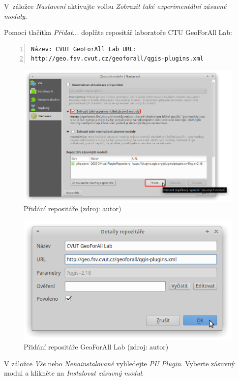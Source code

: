 V~záložce \textit{Nastavení} aktivujte volbu \textit{Zobrazit také
experimentální zásuvné moduly}.

Pomocí tlačítka \textit{Přidat...} doplňte repositář laboratoře
CTU GeoForAll Lab:

\begin{lstlisting}[basicstyle=\footnotesize\ttfamily, backgroundcolor
= \color{light-gray}, numbers=left, columns=fullflexible,
keepspaces=true] Název: CVUT GeoForAll Lab URL:
http://geo.fsv.cvut.cz/geoforall/qgis-plugins.xml
\end{lstlisting}

	\begin{figure}[H] \centering
		\includegraphics[width=.85\textwidth]{./pictures/instalace-pridani_repositare.png}
		\caption[Přidání repositáře]{Přidání repositáře
(zdroj: autor)}
		\label{fig:manual_pridani_repozitare}
 	\end{figure}
 	
	\begin{figure}[H] \centering
		\includegraphics[width=.6\textwidth]{./pictures/instalace-pridani_repositare_geoforall.png}
		\caption[Přidání repositáře GeoForAll Lab]{Přidání
repositáře GeoForAll Lab (zdroj: autor)}
		\label{fig:manual_pridani_repozitare_geoforall_lab}
 	\end{figure}

V záložce \textit{Vše} nebo \textit{Nenainstalované} vyhledejte
\textit{PU Plugin}. Vyberte zásuvný modul a klikněte na
\textit{Instalovat zásuvný modul}.

